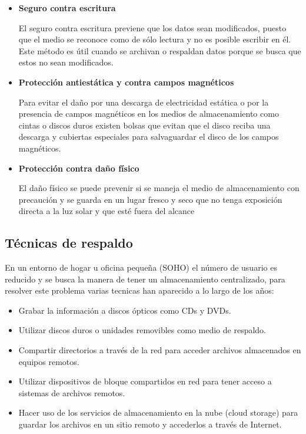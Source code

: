     \begin{itemize}

      \item \textbf{Seguro contra escritura}
        
El seguro contra escritura previene que los datos sean modificados, puesto que el medio se reconoce como de s\'{o}lo lectura y no es posible escribir en \'{e}l. Este m\'{e}todo es \'{u}til cuando se archivan o respaldan datos porque se busca que estos no sean modificados.

      \item \textbf{Protecci\'{o}n antiest\'{a}tica y contra campos magn\'{e}ticos}
        
Para evitar el da\~{n}o por una descarga de electricidad est\'{a}tica o por la presencia de campos magn\'{e}ticos en los medios de almacenamiento como cintas o discos duros existen bolsas que evitan que el disco reciba una descarga y cubiertas especiales para salvaguardar el disco de los campos magn\'{e}ticos.

      \item \textbf{Protecci\'{o}n contra da\~{n}o f\'{i}sico}
       
El da\~{n}o f\'{i}sico se puede prevenir si se maneja el medio de almacenamiento con precauci\'{o}n y se guarda en un lugar fresco y seco que no tenga exposici\'{o}n directa a la luz solar y que est\'{e} fuera del alcance 

    \end{itemize}

  \subsection {T\'{e}cnicas de respaldo}
  

En un entorno de hogar u oficina peque\~{n}a (SOHO) el n\'{u}mero de usuario es reducido y se busca la manera de tener un almacenamiento centralizado, para resolver este problema varias tecnicas han aparecido a lo largo de los a\~{n}os:

    \begin{itemize}
      \item Grabar la informaci\'{o}n a discos \'{o}pticos como CDs y DVDs.
      \item Utilizar discos duros o unidades removibles como medio de respaldo.
      \item Compartir directorios a trav\'{e}s de la red para acceder archivos almacenados en equipos remotos.
      \item Utilizar dispositivos de bloque compartidos en red para tener acceso a sistemas de archivos remotos.
      \item Hacer uso de los servicios de almacenamiento en la nube (cloud storage) para guardar los archivos en un sitio remoto y accederlos a trav\'{e}s de Internet.
    \end{itemize}

